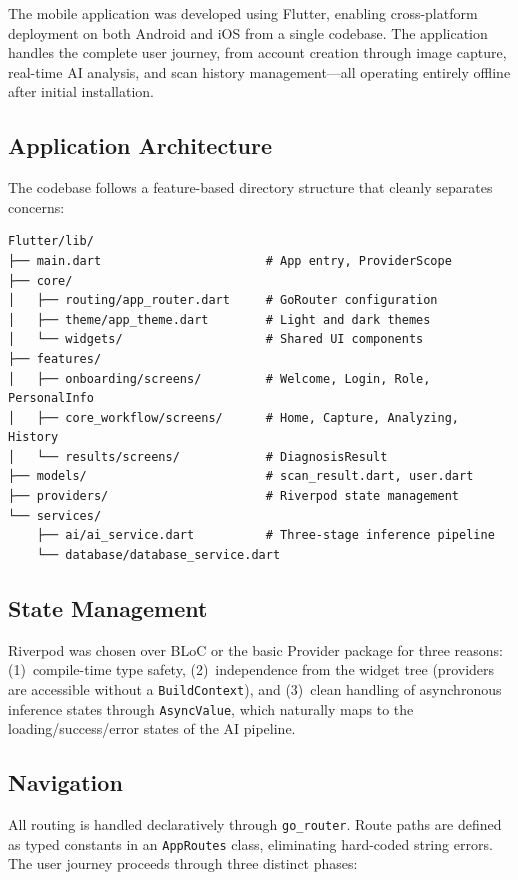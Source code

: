 The mobile application was developed using Flutter, enabling cross-platform deployment on both Android and iOS from a single codebase. The application handles the complete user journey, from account creation through image capture, real-time AI analysis, and scan history management---all operating entirely offline after initial installation.

\subsection{Application Architecture}

The codebase follows a feature-based directory structure that cleanly separates concerns:

\begin{verbatim}
Flutter/lib/
├── main.dart                       # App entry, ProviderScope
├── core/
│   ├── routing/app_router.dart     # GoRouter configuration
│   ├── theme/app_theme.dart        # Light and dark themes
│   └── widgets/                    # Shared UI components
├── features/
│   ├── onboarding/screens/         # Welcome, Login, Role, PersonalInfo
│   ├── core_workflow/screens/      # Home, Capture, Analyzing, History
│   └── results/screens/            # DiagnosisResult
├── models/                         # scan_result.dart, user.dart
├── providers/                      # Riverpod state management
└── services/
    ├── ai/ai_service.dart          # Three-stage inference pipeline
    └── database/database_service.dart
\end{verbatim}

\subsection{State Management}

Riverpod was chosen over BLoC or the basic Provider package for three reasons: (1)~compile-time type safety, (2)~independence from the widget tree (providers are accessible without a \texttt{BuildContext}), and (3)~clean handling of asynchronous inference states through \texttt{AsyncValue}, which naturally maps to the loading/success/error states of the AI pipeline.

\subsection{Navigation}

All routing is handled declaratively through \texttt{go\_router}. Route paths are defined as typed constants in an \texttt{AppRoutes} class, eliminating hard-coded string errors. The user journey proceeds through three distinct phases:

